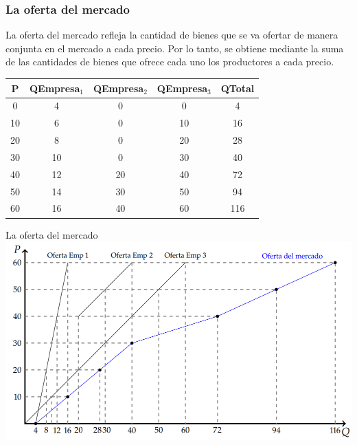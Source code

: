 \documentclass{beamer}
\begin{document}
\begin{frame}
    \frametitle{La oferta del mercado}
    \begin{boxA}
        \centering
        La oferta del mercado refleja la cantidad de bienes que se va ofertar de manera conjunta en el mercado a cada precio. Por lo tanto, se obtiene mediante la suma de las cantidades de bienes que ofrece cada uno los productores a cada precio.
    \end{boxA}
    \renewcommand{\arraystretch}{1.2} %
    \begin{table}[h]
        \centering
        \setlength{\arrayrulewidth}{1pt} %
        \begin{tabular}{|c|c|c|c|c|}
            \hline
            \rowcolor{blue!20} %
            \textbf{P} & \textbf{QEmpresa$_1$} & \textbf{QEmpresa$_2$} & \textbf{QEmpresa$_3$} & \textbf{QTotal} \\
            \hline
            0  & 4  & 0  & 0  & 4  \\
            10 & 6  & 0  & 10 & 16 \\
            20 & 8  & 0  & 20 & 28 \\
            30 & 10 & 0  & 30 & 40 \\
            40 & 12 & 20 & 40 & 72 \\
            50 & 14 & 30 & 50 & 94 \\
            60 & 16 & 40 & 60 & 116 \\
            \hline
        \end{tabular}
    \end{table}
\end{frame}

\begin{frame}{La oferta del mercado}
    \centering
    \includegraphics[scale=0.5]{../Figures/C14.1.png}
\end{frame}
\end{document}
